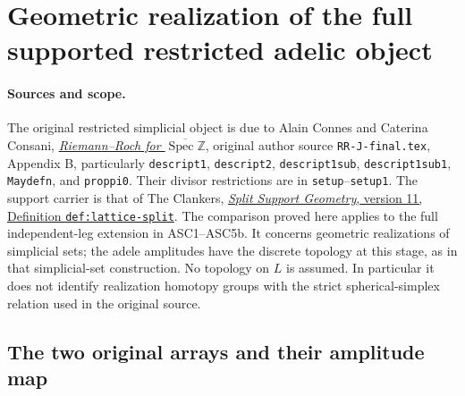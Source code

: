 \section{Geometric realization of the full supported restricted adelic object}
\label{sec:supported-realization-comparison}

\paragraph{Sources and scope.}
The original restricted simplicial object is due to Alain Connes and
Caterina Consani, \href{https://arxiv.org/abs/2205.01391v2}{\emph{Riemann--Roch
for $\overline{\operatorname{Spec}\mathbb Z}$}}, original author source
\nolinkurl{RR-J-final.tex}, Appendix B, particularly
\texttt{descript1}, \texttt{descript2}, \texttt{descript1sub},
\texttt{descript1sub1}, \texttt{Maydefn}, and \texttt{proppi0}.
Their divisor restrictions are in \texttt{setup}--\texttt{setup1}.
The support carrier is that of The Clankers,
\href{https://github.com/KokunoYumeto/zeta-function-research-reader/blob/a2851f9eb352e7e4376bc629de86fa4ed9c1c434/workbenches/splitzero-tandem/foundations/split-support-geometry-v11/split_support_geometry_arithmetic_curve_v11.tex#L1226}
{\emph{Split Support Geometry}, version 11, Definition \texttt{def:lattice-split}}.
The comparison proved here applies to the full independent-leg extension
in ASC1--ASC5b. It concerns geometric realizations of simplicial sets;
the adele amplitudes have the discrete topology at this stage, as in
that simplicial-set construction. No topology on $L$ is assumed.
In particular it does not identify realization homotopy groups with
the strict spherical-simplex relation used in the original source.

\subsection{The two original arrays and their amplitude map}

